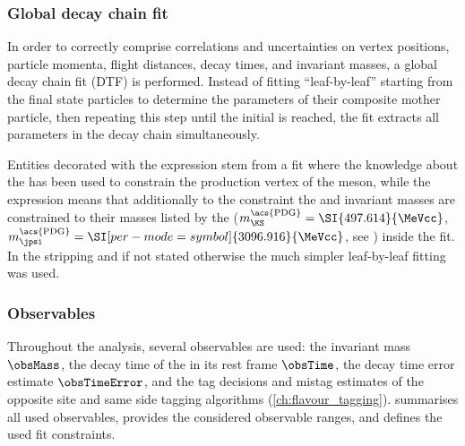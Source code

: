 \subsubsection{Global decay chain fit}
\label{sec:measurement_of_sin2beta:data_preparation:dtf}

In order to correctly comprise correlations and uncertainties on vertex
positions, particle momenta, flight distances, decay times, and invariant
masses, a global decay chain fit (\acs{DTF}) \cite{Hulsbergen:2005pu} is
performed. Instead of fitting \enquote{leaf-by-leaf} starting from the final
state particles to determine the parameters of their composite mother particle,
then repeating this step until the initial \bhadron is reached, the \DTF fit
extracts all parameters in the decay chain simultaneously.

Entities decorated with the expression \dtfpv stem from a \DTF fit where the
knowledge about the \PV has been used to constrain the production
vertex of the \Bd meson, while the expression \dtf means that additionally to
the \PV constraint the \jpsi and \KS invariant masses are constrained to their
masses listed by the \PDG ($m_{\KS}^{\text{\acs{PDG}}}=\SI{497.614}{\MeVcc}$,
$m_{\jpsi}^{\text{\acs{PDG}}} = \SI[per-mode=symbol]{3096.916}{\MeVcc}$, see
\cite{Agashe:2014kda}) inside the \DTF fit. In the stripping and if not stated
otherwise the much simpler leaf-by-leaf fitting was used.

\subsubsection{Observables}
\label{sec:measurement_of_sin2beta:data_preparation:observables}

Throughout the analysis, several observables are used: the \Bd invariant mass
$\obsMass$, the decay time of the \Bd in its rest frame $\obsTime$, the \Bd
decay time error estimate $\obsTimeError$, and the tag decisions
\obsTagOSSS and mistag estimates \obsEtaOSSS of the opposite site and same side
tagging algorithms (\cf \cref{ch:flavour_tagging}).
 summarises all
used observables, provides the considered observable ranges, and defines the
used fit constraints.

